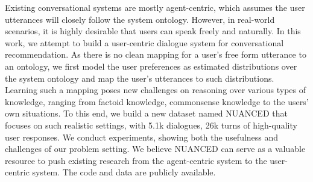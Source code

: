 Existing conversational systems are mostly agent-centric, which assumes the user utterances will closely follow the system ontology. However, in real-world scenarios, it is highly desirable that users can speak freely and naturally. In this work, we attempt to build a user-centric dialogue system for conversational recommendation. As there is no clean mapping for a user's free form utterance to an ontology, we first model the user preferences as estimated distributions over the system ontology and map the user's utterances to such distributions. Learning such a mapping poses new challenges on reasoning over various types of knowledge, ranging from factoid knowledge, commonsense knowledge to the users' own situations. To this end, we build a new dataset named NUANCED that focuses on such realistic settings, with 5.1k dialogues, 26k turns of high-quality user responses. We conduct experiments, showing both the usefulness and challenges of our problem setting. We believe NUANCED can serve as a valuable resource to push existing research from the agent-centric system to the user-centric system. The code and data are publicly available.
